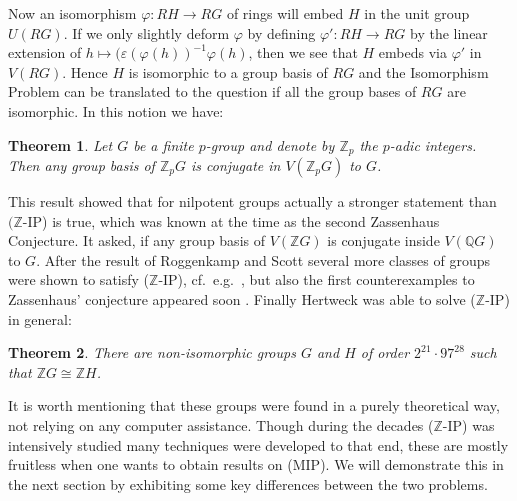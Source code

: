 \documentclass[11pt, a4paper]{amsart}
\newtheorem{theorem}{Theorem}[section]
\theoremstyle{definition}
\begin{document}
Now an isomorphism $\varphi: RH \rightarrow RG$ of rings will embed $H$ in the unit group $U(RG)$. If we only slightly deform $\varphi$ by defining $\varphi': RH \rightarrow RG$ by the linear extension of $h \mapsto (\varepsilon(\varphi(h))^{-1} \varphi(h)$, then we see that $H$ embeds via $\varphi'$ in $V(RG)$. Hence $H$ is isomorphic to a group basis of $RG$ and the Isomorphism Problem can be translated to the question if all the group bases of $RG$ are isomorphic. In this notion we have:

\begin{theorem}\label{th:RoggenkampScottWeiss}\cite{RoggenkampScott87, Weiss88}
Let $G$ be a finite $p$-group and denote by $\mathbb{Z}_p$ the $p$-adic integers. Then any group basis of $\mathbb{Z}_p G$ is conjugate in $V(\mathbb{Z}_p G)$ to $G$.
\end{theorem}

This result showed that for nilpotent groups actually a stronger statement than $(\mathbb{Z}$-IP) is true, which was known at the time as the second Zassenhaus Conjecture. It asked, if any group basis of $V(\mathbb{Z}G)$ is conjugate inside $V(\mathbb{Q}G)$ to $G$. After the result of Roggenkamp and Scott several more classes of groups were shown to satisfy ($\mathbb{Z}$-IP), cf.\ e.g.\ \cite{RoggenkampTaylor}, but also the first counterexamples to Zassenhaus' conjecture appeared soon \cite{Klingler91}. Finally Hertweck was able to solve ($\mathbb{Z}$-IP) in general:

\begin{theorem}\cite{Hertweck01}
There are non-isomorphic groups $G$ and $H$ of order $2^{21}\cdot 97^{28}$ such that $\mathbb{Z}G \cong \mathbb{Z}H$.
\end{theorem}

It is worth mentioning that these groups were found in a purely theoretical way, not relying on any computer assistance. Though during the decades ($\mathbb{Z}$-IP) was intensively studied many techniques were developed to that end, these are mostly fruitless when one wants to obtain results on (MIP). We will demonstrate this in the next section by exhibiting some key differences between the two problems.
\end{document}
